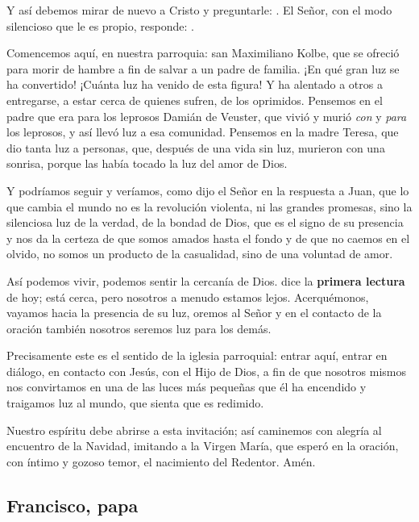 \begin{body}
\begin{body}
Y así debemos mirar de nuevo a Cristo y preguntarle: . El Señor, con el modo silencioso que le es propio, responde: .

Comencemos aquí, en nuestra parroquia: san Maximiliano Kolbe, que se ofreció para morir de hambre a fin de salvar a un padre de familia. ¡En qué gran luz se ha convertido! ¡Cuánta luz ha venido de esta figura! Y ha alentado a otros a entregarse, a estar cerca de quienes sufren, de los oprimidos. Pensemos en el padre que era para los leprosos Damián de Veuster, que vivió y murió \emph{con} y \emph{para} los leprosos, y así llevó luz a esa comunidad. Pensemos en la madre Teresa, que dio tanta luz a personas, que, después de una vida sin luz, murieron con una sonrisa, porque las había tocado la luz del amor de Dios.

Y podríamos seguir y veríamos, como dijo el Señor en la respuesta a Juan, que lo que cambia el mundo no es la revolución violenta, ni las grandes promesas, sino la silenciosa luz de la verdad, de la bondad de Dios, que es el signo de su presencia y nos da la certeza de que somos amados hasta el fondo y de que no caemos en el olvido, no somos un producto de la casualidad, sino de una voluntad de amor.

Así podemos vivir, podemos sentir la cercanía de Dios.  dice la \textbf{primera lectura} de hoy; está cerca, pero nosotros a menudo estamos lejos. Acerquémonos, vayamos hacia la presencia de su luz, oremos al Señor y en el contacto de la oración también nosotros seremos luz para los demás.

Precisamente este es el sentido de la iglesia parroquial: entrar aquí, entrar en diálogo, en contacto con Jesús, con el Hijo de Dios, a fin de que nosotros mismos nos convirtamos en una de las luces más pequeñas que él ha encendido y traigamos luz al mundo, que sienta que es redimido.

Nuestro espíritu debe abrirse a esta invitación; así caminemos con alegría al encuentro de la Navidad, imitando a la Virgen María, que esperó en la oración, con íntimo y gozoso temor, el nacimiento del Redentor. Amén.



\subsection{Francisco, papa}


\end{body}
\end{body}
